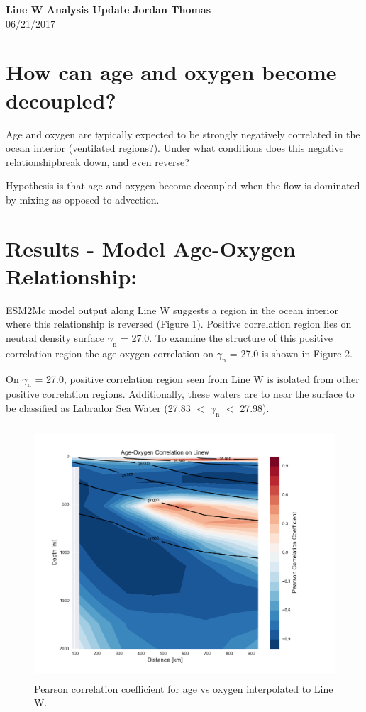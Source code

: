 \documentclass[11pt]{article}
\begin{document}
\noindent
\large\textbf{Line W Analysis Update} \hfill \textbf{Jordan Thomas} \\
06/21/2017 \\

\section*{How can age and oxygen become decoupled?}

Age and oxygen are typically expected to be strongly negatively correlated in the
ocean interior (ventilated regions?). Under what conditions does this negative
relationshipbreak down, and even reverse?

Hypothesis is that age and oxygen become decoupled
when the flow is dominated by mixing as opposed to advection.


\section*{Results - Model Age-Oxygen Relationship:}
ESM2Mc model output along Line W suggests a region in the ocean interior where
this relationship is reversed (Figure 1). Positive correlation region lies on
neutral density surface $\gamma_{\mathrm{n}}$ = 27.0. To examine the structure
of this positive correlation region the age-oxygen correlation on
$\gamma_{\mathrm{n}}$ = 27.0 is shown in Figure 2.

On $\gamma_{\mathrm{n}}$ = 27.0, positive correlation region seen from Line W is
isolated from other positive correlation regions. Additionally, these waters are
to near the surface to be classified as Labrador Sea Water (27.83 $<$
$\gamma_{\mathrm{n}}$ $<$ 27.98).

\begin{figure}[b!]
    \centering
    \includegraphics[height=3.7in]{correlation_on_linew.pdf}
    \caption{Pearson correlation coefficient for age vs oxygen interpolated to
    Line W.}
\end{figure}
\end{document}
